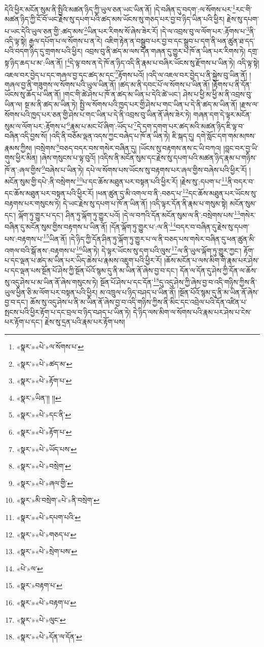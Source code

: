 དེའི་ཕྱིར་མངོན་སུམ་ནི་སྤྱིའི་མཚན་ཉིད་ཀྱི་ཡུལ་ཅན་ཡང་ཡིན་ནོ། །དེ་བཞིན་དུ་བདག་:ལ་སོགས་པར་\footnote{«སྣར་»«པེ་»ལ་སོགས་པ་}རང་གི་མཚན་ཉིད་ཀྱི་ངོ་བོ་ཡང་རྗེས་སུ་དཔག་པའི་ཚད་མས་ཡོངས་སུ་གཅད་པར་བྱ་བ་ཉིད་ཡིན་པའི་ཕྱིར། རྗེས་སུ་དཔག་པ་ཡང་དེའི་ཡུལ་ཅན་གྱི་:ཚད་མས་\footnote{«སྣར་»«པེ་»ཚད་མ་}ཡིན་པར་རིགས་སོ་ཞེས་ཟེར་རོ། །དེ་ལ་འབྲས་བུ་ལ་ལོག་པར་:རྟོགས་པ་\footnote{«སྣར་»«པེ་»རྟོག་པ་}ནི་འདི་ལྟ་སྟེ། རྒྱལ་དཔོག་པ་ལ་སོགས་པ་ན་རེ། འཇིག་རྟེན་ན་བསྒྲུབ་པར་བྱ་བ་དང་སྒྲུབ་པ་དག་ནི་ཕན་ཚུན་ཐ་དད་པའི་བདག་ཉིད་དུ་གྲགས་པའི་ཕྱིར། འབྲས་བུ་ནི་ཚད་མ་ལས་དོན་གཞན་དུ་གྱུར་པ་ཁོ་ན་ཡིན་པར་རིགས་ཏེ། དགྲ་སྟ་ཉིད་ཆད་པ་མ་:ཡིན་ནོ། །\footnote{«སྣར་»ཡིན་།། །།}དེ་ལྟ་བས་ན་དེ་ཁོ་ན་ཉིད་འདི་ནི་རྣམ་པ་བཞིར་ཡོངས་སུ་རྫོགས་པ་ཡིན་ཏེ། འདི་ལྟ་སྟེ། འཇལ་བར་བྱེད་པ་དང་གཞལ་བྱ་དང་ཚད་མ་དང་\footnote{«སྣར་»«པེ་»དང་ནི་}རྟོགས་པའོ། །འདི་ལ་འཇལ་བར་བྱེད་པ་ནི་སྐྱེས་བུ་ཡིན་ནོ། །གཞལ་བྱ་ནི་གཟུགས་ལ་སོགས་པའི་ཡུལ་ཡིན་ནོ། །ཚད་མ་ནི་དབང་པོ་ལ་སོགས་པ་ཡིན་ནོ། །རྟོགས་པ་ནི་དོན་ཡོངས་སུ་ཆོད་པ་ཡིན་ནོ། །གང་གི་ཚེ་ཤེས་པ་ཁོ་ན་ཚད་མ་ཡིན་པ་དེའི་ཚེ་ཡང་། ཤེས་པ་ཕྱི་མ་ཕྱི་མ་ནི་འབྲས་བུ་ཡིན་ལ། སྔ་མ་ནི་ཚད་མ་ཡིན་ཏེ། སྤྱི་ལ་སོགས་པའི་ཁྱད་པར་གྱི་ཤེས་པ་གང་ཡིན་པ་དེ་ནི་ཚད་མ་ཡིན་ནོ། །རྫས་ལ་སོགས་པའི་ཁྱད་པར་ཅན་གྱི་ཤེས་པ་གང་ཡིན་པ་དེ་ནི་འབྲས་བུ་ཡིན་ནོ་ཞེས་ཟེར་ཏེ། གཞན་དག་དེ་ལྟར་མངོན་སུམ་ལ་ལོག་པར་:རྟོགས་པ་\footnote{«སྣར་»«པེ་»རྟོག་པ་}རྣམ་པ་མང་པོ་ཞིག་:ཡོད་པ་\footnote{«སྣར་»«པེ་»ཡོད་པས་}དེ་དག་དགག་པར་ཚད་མའི་མཚན་ཉིད་ཇི་ལྟ་བ་བཞིན་འདི་བྱས་སོ། །འདི་ནི་བཅོམ་ལྡན་འདས་ཀྱང་བཞེད་པ་ཁོ་ན་ཡིན་ཏེ། ཇི་སྐད་དུ། དགེ་སློང་དག་གམ་མཁས་རྣམས་ཀྱིས། །བསྲེགས་\footnote{«སྣར་»«པེ་»བསྲེག་}བཅད་བདར་བས་གསེར་བཞིན་དུ། །ཡོངས་སུ་བརྟགས་ནས་ང་ཡི་བཀའ། །བླང་བར་བྱ་ཡི་གུས་ཕྱིར་མིན། །ཞེས་གསུངས་པ་ལྟ་བུའོ། །འདིས་ནི་མངོན་སུམ་དང་རྗེས་སུ་དཔག་པའི་མཚན་ཉིད་རྣམ་པ་གཉིས་ཁོ་ན་:ཞལ་གྱིས་\footnote{«སྣར་»«པེ་»ཞལ་གྱི་}བཞེས་པ་ཡིན་ཏེ། དཔེ་ལ་སོགས་པས་ཡོངས་སུ་བརྟགས་པར་ཞལ་གྱིས་བཞེས་པའི་ཕྱིར་རོ། །མངོན་སུམ་གྱི་དཔེ་:ནི་བསྲེགས་\footnote{«སྣར་»མི་བསྲེག་«པེ་»ནི་བསྲེག་}པ་དང་ཆོས་མཐུན་པར་བསྟན་པའི་ཕྱིར་རོ། །རྗེས་སུ་:དཔག་པ་\footnote{«སྣར་»«པེ་»དཔག་པའི་}ནི་བདར་བ་དང་ཆོས་མཐུན་པར་བསྟན་པའི་ཕྱིར་རོ། །ཕན་ཚུན་དུ་མི་འགལ་བ་ནི་:བཅད་པ་\footnote{«སྣར་»«པེ་»གཅད་པ་}དང་ཆོས་མཐུན་པར་ཡོངས་སུ་བརྟགས་པར་གསུངས་ཏེ། དེ་ཡང་རྗེས་སུ་དཔག་པ་ཁོ་ན་ཡིན་ནོ། །འདི་ལྟར་དོན་ནི་རྣམ་པ་གསུམ་སྟེ། མངོན་སུམ་དང་། ལྐོག་ཏུ་གྱུར་པ་དང་། ཤིན་ཏུ་ལྐོག་ཏུ་གྱུར་པའོ། །དེ་ལ་བཀའི་དོན་མངོན་སུམ་ལ་ནི་:བསྲེགས་པས་\footnote{«སྣར་»«པེ་»སྲེག་པས་}གསེར་བཞིན་དུ་མངོན་སུམ་གྱིས་བརྟགས་པ་ཡིན་ནོ། །དོན་ལྐོག་ཏུ་གྱུར་པ་:ལ་ནི་\footnote{«པེ་»ལ་}བདར་བ་བཞིན་དུ་རྗེས་སུ་དཔག་པས་:བརྟགས་པ་\footnote{«སྣར་»བརྟག་པ་}ཡིན་ནོ། །དེ་ཉིད་ཀྱི་དོན་ཤིན་ཏུ་ལྐོག་ཏུ་གྱུར་པ་ལ་ནི་བཅད་པས་གསེར་བཞིན་དུ་ཕན་ཚུན་མི་འགལ་བའི་སྒོ་ནས་:བརྟགས་པ་\footnote{«སྣར་»«པེ་»བརྟག་པ་}ཡིན་ཏེ། དེ་ལྟར་ཡོངས་སུ་དག་པའི་ལུས་\footnote{«སྣར་»«པེ་»ལུང་}ལ་ནི་ཡུལ་ལྐོག་ཏུ་གྱུར་ཀྱང་། རྟོག་པ་དང་ལྡན་པ་ཚད་མ་ཡིན་པར་ཡིད་ཆེས་པ་རྣམས་འཇུག་པའི་ཕྱིར་རོ། །ཆོས་མངོན་པ་ལས་མིག་གི་རྣམ་པར་ཤེས་པ་དང་ལྡན་པས་སྔོན་པོ་ཤེས་ཀྱི་སྔོན་པོའོ་སྙམ་དུ་ནི་མ་ཡིན་ནོ་ཞེས་བྱ་བ་དང་། དོན་ལ་དོན་དུ་ཤེས་ཀྱི་དོན་ལ་ཆོས་སུ་འདུ་ཤེས་པ་མ་ཡིན་ནོ་ཞེས་གསུངས་ཏེ། སྔོན་པོ་ཤེས་པ་དང་དོན་\footnote{«སྣར་»«པེ་»དོན་ལ་དོན་}དུ་འདུ་ཤེས་ཀྱི་ཞེས་བྱ་བ་འདི་གཉིས་ཀྱིས་ནི་ཡུལ་ཕྱིན་ཅི་མ་ལོག་པར་བསྟན་པའི་ཕྱིར། མ་འཁྲུལ་པ་ཉིད་བཤད་པ་ཡིན་ནོ། །སྔོན་པོའོ་སྙམ་དུ་ནི་མ་ཡིན་ནོ་ཞེས་བྱ་བ་དང་། ཆོས་སུ་འདུ་ཤེས་པ་ནི་མ་ཡིན་ནོ་ཞེས་བྱ་བ་འདི་གཉིས་ཀྱིས་ནི་མིང་དང་འབྲེལ་པའི་དོན་འཛིན་པ་སྤངས་པའི་ཕྱིར་རྟོག་པ་དང་བྲལ་བ་ཉིད་བཤད་པ་ཡིན་ཏེ། དེ་ཉིད་ལས་མིག་ལ་སོགས་པའི་རྣམ་པར་ཤེས་པ་ངེས་པར་རྟོག་པ་དང་། རྗེས་སུ་དྲན་པའི་རྣམ་པར་རྟོག་པས། 
